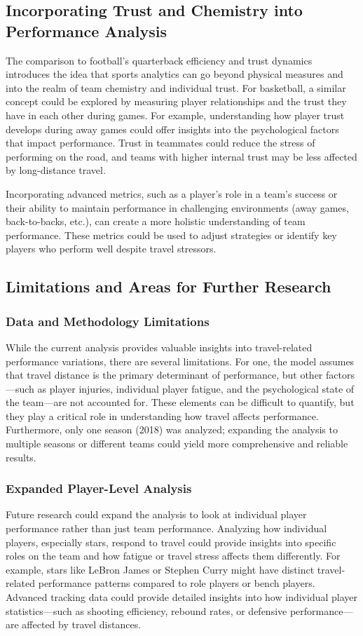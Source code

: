 \documentclass[12pt]{article}
\begin{document}
\subsection{Incorporating Trust and Chemistry into Performance Analysis}
The comparison to football's quarterback efficiency and trust dynamics introduces the idea that sports analytics can go beyond physical measures and into the realm of team chemistry and individual trust. For basketball, a similar concept could be explored by measuring player relationships and the trust they have in each other during games. For example, understanding how player trust develops during away games could offer insights into the psychological factors that impact performance. Trust in teammates could reduce the stress of performing on the road, and teams with higher internal trust may be less affected by long-distance travel.

Incorporating advanced metrics, such as a player’s role in a team’s success or their ability to maintain performance in challenging environments (away games, back-to-backs, etc.), can create a more holistic understanding of team performance. These metrics could be used to adjust strategies or identify key players who perform well despite travel stressors.

\subsection{Limitations and Areas for Further Research}
\subsubsection{Data and Methodology Limitations}
While the current analysis provides valuable insights into travel-related performance variations, there are several limitations. For one, the model assumes that travel distance is the primary determinant of performance, but other factors—such as player injuries, individual player fatigue, and the psychological state of the team—are not accounted for. These elements can be difficult to quantify, but they play a critical role in understanding how travel affects performance. Furthermore, only one season (2018) was analyzed; expanding the analysis to multiple seasons or different teams could yield more comprehensive and reliable results.

\subsubsection{Expanded Player-Level Analysis}
Future research could expand the analysis to look at individual player performance rather than just team performance. Analyzing how individual players, especially stars, respond to travel could provide insights into specific roles on the team and how fatigue or travel stress affects them differently. For example, stars like LeBron James or Stephen Curry might have distinct travel-related performance patterns compared to role players or bench players. Advanced tracking data could provide detailed insights into how individual player statistics—such as shooting efficiency, rebound rates, or defensive performance—are affected by travel distances.
\end{document}
